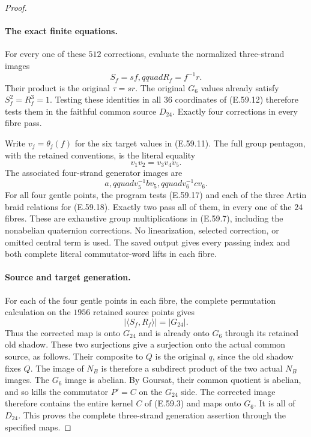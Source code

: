 \begin{proof}
\paragraph{The exact finite equations.}
For every one of these $512$ corrections, evaluate the normalized
three-strand images
\[
                      S_f=sf,qquad R_f=f^{-1}r.
 \tag{E.59.16}
\]
Their product is the original $\tau=sr$. The original $G_6$ values
already satisfy $S_f^2=R_f^3=1$. Testing these identities in all
$36$ coordinates of \textup{(E.59.12)} therefore tests them in
the faithful common source $D_{24}$. Exactly four corrections
in every fibre pass.

Write $v_j=\theta_j(f)$ for the six target values in
\textup{(E.59.11)}. The full group pentagon, with the retained
conventions, is the literal equality
\[
                  v_1v_2=v_3v_4v_5.
 \tag{E.59.17}
\]
The associated four-strand generator images are
\[
                  a,qquad v_5^{-1}bv_5,qquad v_6^{-1}cv_6.
 \tag{E.59.18}
\]
For all four gentle points, the program tests
\textup{(E.59.17)} and each of the three Artin braid relations
for \textup{(E.59.18)}. Exactly two pass all of them, in every
one of the $24$ fibres. These are exhaustive group multiplications
in \textup{(E.59.7)}, including the nonabelian quaternion
corrections. No linearization, selected correction, or omitted
central term is used. The saved output gives every passing index
and both complete literal commutator-word lifts in each fibre.

\paragraph{Source and target generation.}
For each of the four gentle points in each fibre, the complete
permutation calculation on the $1956$ retained source points gives
\[
                  |\langle S_f,R_f\rangle|=|G_{24}|.
 \tag{E.59.19}
\]
Thus the corrected map is onto $G_{24}$ and is already onto $G_6$
through its retained old shadow. These two surjections give a
surjection onto the actual common source, as follows. Their
composite to $Q$ is the original $q$, since the old shadow fixes
$Q$. The image of $N_B$ is therefore a subdirect product of the
two actual $N_B$ images. The $G_6$ image is abelian. By Goursat,
their common quotient is abelian, and so kills the commutator
$P'=C$ on the $G_{24}$ side. The corrected image therefore
contains the entire kernel $C$ of \textup{(E.59.3)} and maps onto
$G_6$. It is all of $D_{24}$. This proves the complete
three-strand generation assertion through the specified maps.


\end{proof}
